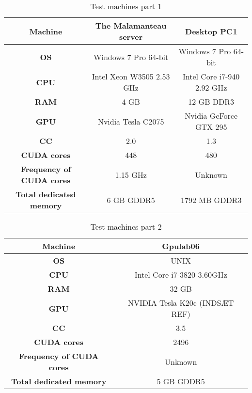 \begin{table}
\begin{center}
\begin{tabular}[ht!]{|c|c|c|}
	\hline
	\multicolumn{1}{|m{2.8cm}|}{\centering \textbf{Machine}} & The Malamanteau server & Desktop PC1 \\ \hline
	\multicolumn{1}{|m{2.8cm}|}{\centering \textbf{OS}} & Windows 7 Pro 64-bit & Windows 7 Pro 64-bit\\ \hline
	\multicolumn{1}{|m{2.8cm}|}{\centering \textbf{CPU}} & Intel Xeon W3505 2.53 GHz & Intel Core i7-940 2.92 GHz \\ \hline
	\multicolumn{1}{|m{2.8cm}|}{\centering \textbf{RAM}} & 4 GB & 12 GB DDR3\\ \hline
	\multicolumn{1}{|m{2.8cm}|}{\centering \textbf{GPU}} & Nvidia Tesla C2075 \cite{tesl} & Nvidia GeForce GTX 295 \cite{gtxx}\\ \hline
	\multicolumn{1}{|m{2.8cm}|}{\centering \textbf{CC}} & 2.0 & 1.3\\ \hline
	\multicolumn{1}{|m{2.8cm}|}{\centering \textbf{CUDA cores}} & 448 & 480\\ \hline
	\multicolumn{1}{|m{2.8cm}|}{\centering \textbf{Frequency of CUDA cores}} & 1.15 GHz & Unknown\\ \hline
	\multicolumn{1}{|m{2.8cm}|}{\centering \textbf{Total dedicated memory}} & 6 GB GDDR5 & 1792 MB GDDR3\\ \hline
\end{tabular}
\end{center}
\caption{Test machines part 1}
\label{table:machinesone}
\end{table}

\begin{table}
\begin{center}
\begin{tabular}[ht!]{|c|c|}
	\hline
	\multicolumn{1}{|m{2.8cm}|}{\centering \textbf{Machine}} & Gpulab06 \\ \hline
	\multicolumn{1}{|m{2.8cm}|}{\centering \textbf{OS}} & UNIX \\ \hline
	\multicolumn{1}{|m{2.8cm}|}{\centering \textbf{CPU}} & Intel Core i7-3820 3.60GHz \\ \hline
	\multicolumn{1}{|m{2.8cm}|}{\centering \textbf{RAM}} & 32 GB \\ \hline
	\multicolumn{1}{|m{2.8cm}|}{\centering \textbf{GPU}} & NVIDIA Tesla K20c (INDSÆT REF) \\ \hline
	\multicolumn{1}{|m{2.8cm}|}{\centering \textbf{CC}} & 3.5 \\ \hline
	\multicolumn{1}{|m{2.8cm}|}{\centering \textbf{CUDA cores}} & 2496 \\ \hline
	\multicolumn{1}{|m{2.8cm}|}{\centering \textbf{Frequency of CUDA cores}} & Unknown \\ \hline
	\multicolumn{1}{|m{2.8cm}|}{\centering \textbf{Total dedicated memory}} & 5 GB GDDR5 \\ \hline
\end{tabular}
\end{center}
\caption{Test machines part 2}
\label{table:machinestwo}
\end{table}

